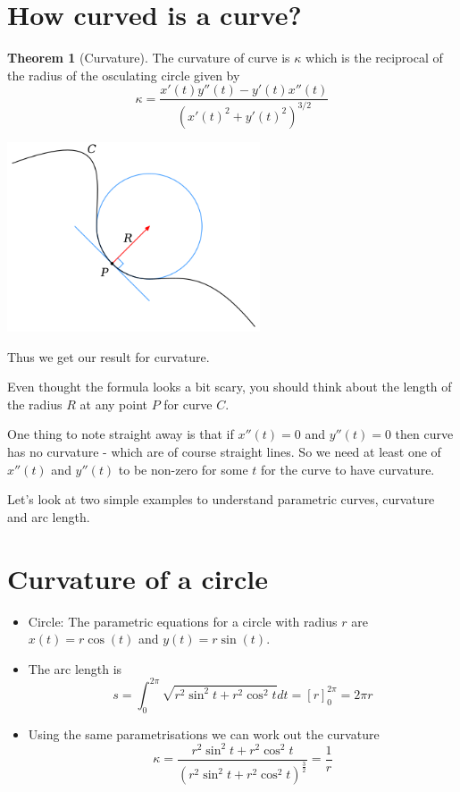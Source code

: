 \documentclass[]{article} %
\theoremstyle{definition}
\theoremstyle{theorem}
\newtheorem{theorem}{Theorem}[section]
\begin{document}
\section{How curved is a curve?}
\begin{tcolorbox}
	\begin{theorem}[Curvature]
		The curvature of curve is $\kappa$ which is the reciprocal of the radius of the osculating circle given by
		\[
		\kappa=\frac{x'(t) y''(t) - y'(t) x''(t)}{\left( x'(t)^2 + y'(t)^2 \right)^{3/2}}
		\]
	\end{theorem}
	\begin{minipage}{\linewidth}
		\centering
		\includegraphics[width=75mm, scale=0.4]{Curvature_circle.png}
	\end{minipage}
\end{tcolorbox}

Thus we get our result for curvature. 

Even thought the formula looks a bit scary, you should think about the length of the radius $R$ at any point $P$ for curve $C$.

One thing to note straight away is that if $x''(t)=0$ and $y''(t)=0$ then curve has no curvature - which are of course straight lines. So we need at least one of $x''(t)$ and $y''(t)$ to be non-zero for some $t$ for the curve to have curvature.

Let's look at two simple examples to understand parametric curves, curvature and arc length.

\section{Curvature of a circle}
\begin{tcolorbox}
	\begin{itemize}	
	\item Circle: The parametric equations for a circle with radius $r$ are $x(t)=r \cos(t)$ and $y(t)= r \sin(t)$. 
	\item The arc length is 
	\[	
	s = \int_{0}^{2 \pi} \sqrt{r^2 \sin^2 t + r^2 \cos^2 t}dt = \left[r \right]_{0}^{2 \pi} = 2 \pi r
	\]
	\item Using the same parametrisations we can work out the curvature
	\[
	\kappa = \frac{r^2 \sin^2 t + r^2 \cos^2 t}{\left(r^2 \sin^2 t + r^2 \cos^2 t \right) ^ \frac{3}{2}} = \frac{1}{r}
	\]
	\end{itemize}
\end{tcolorbox}
\end{document}
